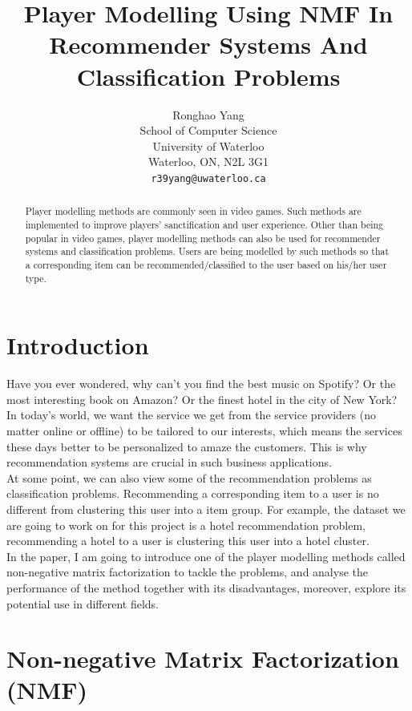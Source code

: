 \documentclass[11pt]{article} %
\title{Player Modelling Using NMF In Recommender Systems And Classification Problems}
\author{
	Ronghao Yang \\
	School of Computer Science\\
	University of Waterloo\\
	Waterloo, ON, N2L 3G1 \\
	\texttt{r39yang@uwaterloo.ca}
}
\begin{document}
\maketitle

\begin{abstract}
Player modelling methods are commonly seen in video games. Such methods are implemented to improve players' sanctification and user experience. Other than being popular in video games, player modelling methods can also be used for recommender systems  and classification problems. Users are being modelled by such methods so that a corresponding item can be recommended/classified to the user based on his/her user type.

\end{abstract}
\section{Introduction}
Have you ever wondered, why can't you find the best music on Spotify? Or the most interesting book on Amazon? Or the finest hotel in the city of New York? In today's world, we want the service we get from the service providers (no matter online or offline) to be tailored to our interests, which means the services these days better to be personalized to amaze the customers. This is why recommendation systems are crucial in such business applications.\\
At some point, we can also view some of the recommendation problems as classification problems. Recommending a corresponding item to a user is no different from clustering this user into a item group. For example, the dataset we are going to work on for this project is a hotel recommendation problem, recommending a hotel to a user is clustering this user into a hotel cluster.\\
In the paper, I am going to introduce one of the player modelling methods called non-negative matrix factorization to tackle the problems, and analyse the performance of the method together with its disadvantages, moreover, explore its potential use in different fields. 
\section{Non-negative Matrix Factorization (NMF)}\label{introduction}
\end{document}
